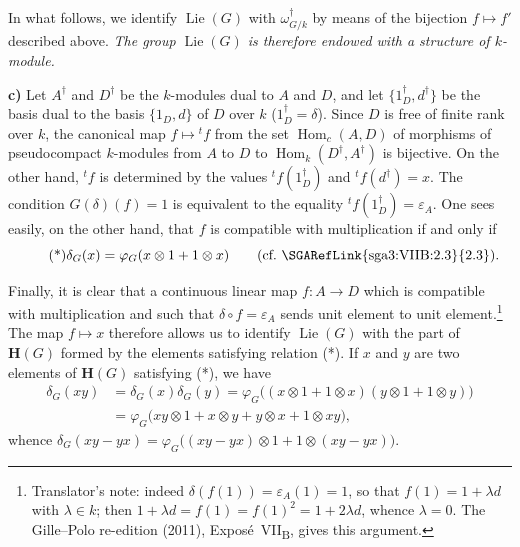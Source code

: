 In what follows, we identify \(\operatorname{Lie}(G)\) with
\(\omega_{G/k}^{\dagger}\) by means of the bijection \(f\mapsto f'\)
described above. \emph{The group \(\operatorname{Lie}(G)\) is therefore
endowed with a structure of \(k\)-module.}

\medskip
\noindent{}\textbf{c)}
Let \(A^\dagger\) and \(D^\dagger\) be the \(k\)-modules dual to
\(A\) and \(D\), and let \(\{1_D^\dagger,d^\dagger\}\) be the basis dual to
the basis \(\{1_D,d\}\) of \(D\) over \(k\) \textup{(}\(1_D^\dagger=\delta\)\textup{)}.
Since \(D\) is free of finite rank over \(k\), the canonical map
\(f\mapsto{}^t f\) from the set \(\operatorname{Hom}_c(A,D)\) of morphisms
of pseudocompact \(k\)-modules from \(A\) to \(D\) to
\(\operatorname{Hom}_k(D^\dagger,A^\dagger)\) is bijective. On the other
hand, \({}^t f\) is determined by the values \({}^t f(1_D^\dagger)\) and
\({}^t f(d^\dagger)=x\). The condition \(G(\delta)(f)=1\) is equivalent to
the equality \({}^t f(1_D^\dagger)=\varepsilon_A\). One sees easily, on
the other hand, that \(f\) is compatible with multiplication if and only
if
\[
  \tag{*}
  \label{sga3:VIIB:2.6:primitive-relation}
  \delta_G(x)=\varphi_G(x\otimes1+1\otimes x)
  \qquad\textup{(cf.\ \SGARefLink{sga3:VIIB:2.3}{2.3})}.
\]

Finally, it is clear that a continuous linear map \(f:A\to D\) which is
compatible with multiplication and such that
\(\delta\circ f=\varepsilon_A\) sends unit element to unit element.\footnote{Translator's note: indeed
\(\delta(f(1))=\varepsilon_A(1)=1\), so that \(f(1)=1+\lambda d\) with \(\lambda\in k\); then
\(1+\lambda d=f(1)=f(1)^2=1+2\lambda d\), whence \(\lambda=0\). The Gille--Polo re-edition (2011),
Expos\'e~VII\textsubscript{B}, gives this argument.} The
map \(f\mapsto x\) therefore allows us to identify \(\operatorname{Lie}(G)\)
with the part of \(\mathbf H(G)\) formed by the elements satisfying
relation \textup{(*)}. If \(x\) and \(y\) are two elements of
\(\mathbf H(G)\) satisfying \textup{(*)}, we have
\[
\begin{aligned}
  \delta_G(xy)
  &=
  \delta_G(x)\delta_G(y)
  =
  \varphi_G\bigl(
    (x\otimes1+1\otimes x)
    (y\otimes1+1\otimes y)
  \bigr)
  \\
  &=
  \varphi_G\bigl(
    xy\otimes1+x\otimes y+y\otimes x+1\otimes xy
  \bigr),
\end{aligned}
\]
whence
\(\delta_G(xy-yx)=\varphi_G\bigl((xy-yx)\otimes1+1\otimes(xy-yx)\bigr)\).

